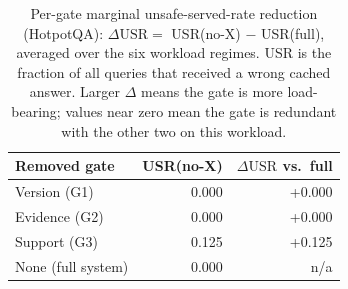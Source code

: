 \begin{table}[t]
\centering\small
\caption{Per-gate marginal unsafe-served-rate reduction (HotpotQA): $\Delta\mathrm{USR}=$ USR(no-X) $-$ USR(full), averaged over the six workload regimes. USR is the fraction of all queries that received a wrong cached answer. Larger $\Delta$ means the gate is more load-bearing; values near zero mean the gate is redundant with the other two on this workload.}
\label{tab:marginal_fh}
\begin{tabular}{l rr}
\toprule
Removed gate & USR(no-X) & $\Delta\mathrm{USR}$ vs.\ full \\
\midrule
Version (G1) & 0.000 & +0.000 \\
Evidence (G2) & 0.000 & +0.000 \\
Support (G3) & 0.125 & +0.125 \\
\midrule
None (full system) & 0.000 & n/a \\
\bottomrule
\end{tabular}
\end{table}
